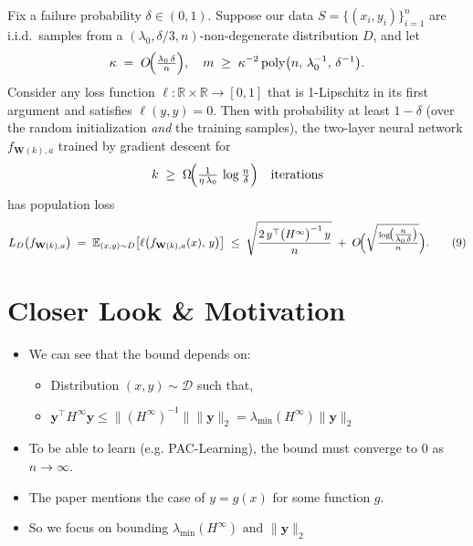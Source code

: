 \documentclass[serif, aspectratio=169]{beamer}
\begin{document}
\begin{frame}
	
	\label{thm:5.1}
	Fix a failure probability $\delta \in (0,1)$. 
	Suppose our data $S = \{(x_i,y_i)\}_{i=1}^n$ are i.i.d.\ samples 
	from a $(\lambda_0,\delta/3,n)$-non-degenerate distribution $D$, 
	and let 
	\[
	\kappa \;=\; O\!\Bigl(\tfrac{\lambda_0\,\delta}{n}\Bigr),
	\quad
	m \;\ge\; \kappa^{-2}\,\mathrm{poly}\bigl(n,\,\lambda_0^{-1},\,\delta^{-1}\bigr).
	\]
	Consider any loss function 
	$\ell:\mathbb{R}\times\mathbb{R}\to[0,1]$ 
	that is 1-Lipschitz in its first argument and satisfies $\ell(y,y)=0$. 
	Then with probability at least $1 - \delta$ 
	(over the random initialization \emph{and} the training samples), 
	the two-layer neural network $f_{\mathbf{W}(k),a}$ 
	trained by gradient descent for 
	\[
	k \;\ge\; \Omega\!\Bigl(\tfrac{1}{\eta\,\lambda_0}\,\log\tfrac{n}{\delta}\Bigr)
	\quad\text{iterations}
	\]
	has population loss
	\[
	L_D\bigl(f_{\mathbf{W}(k),a}\bigr)
	\;=\;
	\mathbb{E}_{(x,y)\sim D}\bigl[\ell\bigl(f_{\mathbf{W}(k),a}(x),\,y\bigr)\bigr]
	\;\le\;
	\sqrt{\frac{2\,y^\top \bigl(H^\infty\bigr)^{-1}\,y}{n}}
	\;+\;
	O\!\Bigl(\sqrt{\tfrac{\log\!\bigl(\tfrac{n}{\lambda_0\,\delta}\bigr)}{n}}\Bigr).
	\tag{9}
	\]

\end{frame}

\section{Closer Look \& Motivation}

\begin{frame}
	\begin{itemize}
		\item We can see that the bound depends on:
		\begin{itemize}
		
			 \item Distribution \((x,y) \sim \mathcal{D}\) such that,
			\item \(\mathbf{y}^\top H^\infty \mathbf{y} \leq \|(H^\infty)^{-1}\| \|\mathbf{y}\|_2 = \lambda_{\min}(H^{\infty}) \|\mathbf{y}\|_2 \)
		\end{itemize}  
		
		
		\item To be able to  learn (e.g. PAC-Learning), the bound must converge to \(0\) as \(n \to \infty\).
		
		\item The paper mentions the case of \(y=g(x)\) for some function \(g\).
		
		\item So we focus on bounding \(\lambda_{\min}(H^{\infty}) \text{ and } \|\mathbf{y}\|_2\)
		
	\end{itemize}

\end{frame}
\end{document}
